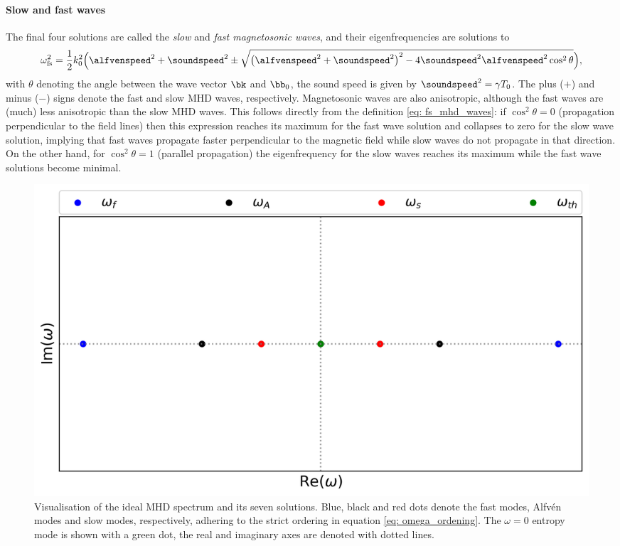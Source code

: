 \paragraph{Slow and fast waves}
The final four solutions are called the \emph{slow} and \emph{fast magnetosonic waves}, and their eigenfrequencies are solutions to
\begin{equation} \label{eq: fs_mhd_waves}
  \omega_\text{fs}^2 = \frac{1}{2}k_0^2\Bigl(
    \alfvenspeed^2 + \soundspeed^2 \pm \sqrt{
      \left(\alfvenspeed^2 + \soundspeed^2\right)^2 - 4 \soundspeed^2 \alfvenspeed^2 \cos^2\theta
    }
  \Bigr),
\end{equation}
with $\theta$ denoting the angle between the wave vector $\bk$ and $\bb_0$, the sound speed is given by $\soundspeed^2 = \gamma T_0$. The plus ($+$) and minus ($-$) signs denote the fast and slow MHD waves, respectively. Magnetosonic waves are also anisotropic, although the fast waves are (much) less anisotropic than the slow MHD waves. This follows directly from the definition \eqref{eq: fs_mhd_waves}: if $\cos^2\theta = 0$ (propagation perpendicular to the field lines) then this expression reaches its maximum for the fast wave solution and collapses to zero for the slow wave solution, implying that fast waves propagate faster perpendicular to the magnetic field while slow waves do not propagate in that direction. On the other hand, for $\cos^2\theta = 1$ (parallel propagation) the eigenfrequency for the slow waves reaches its maximum while the fast wave solutions become minimal.

\begin{figure}[b]
  \centering
  \includegraphics[width=\textwidth]{spectrum_adiabatic.png}
  \caption{
    Visualisation of the ideal MHD spectrum and its seven solutions.
    Blue, black and red dots denote the fast modes, Alfv\'en modes and slow modes, respectively, adhering to the strict ordering in equation \eqref{eq: omega_ordening}. The $\omega = 0$ entropy mode is shown with a green dot, the real and imaginary axes are denoted with dotted lines.
  }
  \label{fig: adiabatic_spectrum}
\end{figure}

